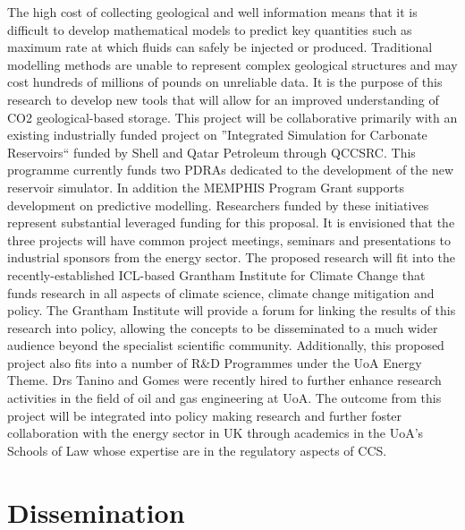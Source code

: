 \documentclass[12pts,a4paper,amsmath,amssymb,floatfix]{article}%
\begin{document}
The high cost of collecting geological and well information means that it is difficult to develop mathematical models to predict key quantities such as maximum rate at which fluids can safely be injected or produced.  Traditional modelling methods are unable to represent complex geological structures and may cost hundreds of millions of pounds on unreliable data.  It is the purpose of this research to develop new tools that will allow for an improved understanding of CO2 geological-based storage. This project will be collaborative primarily with an existing industrially funded project on ”Integrated Simulation for Carbonate Reservoirs“ funded by Shell and Qatar Petroleum through QCCSRC. This programme currently funds two PDRAs dedicated to the development of the new reservoir simulator. In addition the MEMPHIS Program Grant supports development on predictive modelling. Researchers funded by these initiatives represent substantial leveraged funding for this proposal.  It is envisioned that the three projects will have common project meetings, seminars and presentations to industrial sponsors from the energy sector.
The proposed research will fit into the recently-established ICL-based Grantham Institute for Climate Change that funds research in all aspects of climate science, climate change mitigation and policy.   The Grantham Institute will provide a forum for linking the results of this research into policy, allowing the concepts to be disseminated to a much wider audience beyond the specialist scientific community. Additionally, this proposed project also fits into a number of R$\&$D Programmes under the UoA Energy Theme. Drs Tanino and Gomes were recently hired to further enhance research activities in the field of oil and gas engineering at UoA.  The outcome from this project will be integrated into policy making research and further foster collaboration with the energy sector in UK through academics in the UoA’s Schools of Law whose expertise are in the regulatory aspects of CCS. 


\section{Dissemination}
\end{document}
